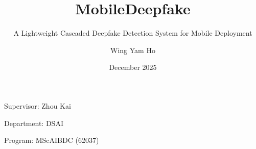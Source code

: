 \documentclass[aspectratio=169,12pt]{beamer}
\title[MobileDeepfake]{MobileDeepfake}
\subtitle{A Lightweight Cascaded Deepfake Detection System for Mobile Deployment}
\author{Wing Yam Ho}
\institute{The Hong Kong Polytechnic University}
\date{December 2025}
\newcommand{\supervisor}{Zhou Kai}
\newcommand{\department}{DSAI}
\newcommand{\program}{MScAIBDC (62037)}
\begin{document}
\begin{frame}
\begin{center}
\vspace*{1.5cm}
{\Huge \textbf{\inserttitle}}

\vspace{1em}
{\large \insertsubtitle}

\vspace{1em}
{\Large \insertauthor}

\vspace{0.5em}
{\normalsize \insertinstitute}

\vspace{1.5em}
{\small Supervisor: \supervisor}

\vspace{0.3em}
{\small Department: \department}

\vspace{0.3em}
{\small Program: \program}

\vfill
{\normalsize \insertdate}
\end{center}
\end{frame}
\end{document}
